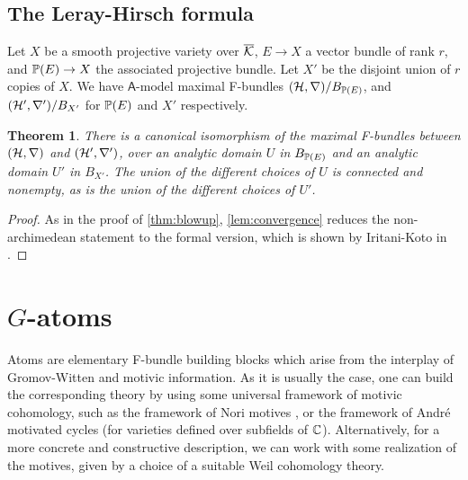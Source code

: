 \documentclass[twoside,leqno]{article}
\numberwithin{equation}{section}
\theoremstyle{plain}
\newtheorem{theorem}[equation]{Theorem}
\theoremstyle{definition}
\begin{document}
\subsection{The Leray-Hirsch formula} \label{ssec:LH}

Let $X$ be a smooth projective variety over $\overline{\mathcal K}$, $E \to X$ a vector bundle of rank $r$, and $\mathbb P(E) \to X$ the associated projective bundle.
Let $X'$ be the disjoint union of $r$ copies of $X$.
We have $\mathsf{A}$-model maximal F-bundles $(\mathcal H, \nabla)/B_{\mathbb P(E)}$, and $(\mathcal H', \nabla')/B_{X'}$ for $\mathbb P(E)$ and $X'$ respectively.

\begin{theorem} \label{thm:projective_bundle}
  There is a canonical isomorphism of the maximal F-bundles between $(\mathcal H, \nabla)$ and $(\mathcal H', \nabla')$, over an analytic domain $U$ in $B_{\mathbb P(E)}$ and an analytic domain $U'$ in $B_{X'}$.
  The union of the different choices of $U$ is connected and nonempty, as is the union of the different choices of $U'$.
\end{theorem}

\begin{proof}
  As in the proof of \cref{thm:blowup}, \cref{lem:convergence} reduces the non-archimedean statement to the formal version, which is shown by Iritani-Koto in \cite[Theorem 5.1]{Iritani_Koto}.
\end{proof}

\section{\texorpdfstring{$G$}{G}-atoms} \label{sec:Gatoms}

Atoms are elementary F-bundle building blocks which arise from the interplay of Gromov-Witten and motivic information. As it is usually the case, one can build the corresponding theory by using some universal framework of motivic cohomology, such as the framework of Nori motives  \cite{nori-tifr,hms-periods.nori}, or the framework of Andr\'{e} motivated cycles \cite{Andre_Pour_une_theorie_inconditionnelle_des_motifs,Andre-book} (for varieties defined over subfields of $\mathbb C$). Alternatively, for a more concrete and constructive description, we can work with some realization of the motives,  given by a choice of a suitable Weil cohomology theory.
\end{document}
